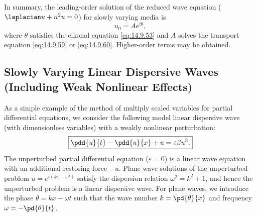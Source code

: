 In summary, the leading-order solution of the reduced wave equation ($\laplacian u + n^2 u = 0$) for slowly varying media is
\begin{equation}
u_0 = Ae^{i\theta},
\label{eq:14.9.61}
\end{equation}
where $\theta$ satisfies the eikonal equation \eqref{eq:14.9.53} and $A$ solves the transport equation \eqref{eq:14.9.59} or \eqref{eq:14.9.60}. Higher-order terms may be obtained.

\subsection{Slowly Varying Linear Dispersive Waves (Including Weak Nonlinear Effects)}
\label{subsec:14.9.5}

As a simple example of the method of multiply scaled variables for partial differential equations, we consider the following model linear dispersive wave (with dimensionless variables) with a weakly nonlinear perturbation:
\begin{equation}
\boxed{\pdd{u}{t} - \pdd{u}{x} + u = \varepsilon\beta u^3.}
\label{eq:14.9.62}
\end{equation}
The unperturbed partial differential equation ($\varepsilon = 0$) is a linear wave equation with an additional restoring force $-u$. Plane wave solutions of the unperturbed problem $u = e^{i(kx - \omega t)}$ satisfy the dispersion relation $\omega^2 = k^2 + 1$, and hence the unperturbed problem is a linear dispersive wave. For plane waves, we introduce the phase $\theta = kx - \omega t$ such that the wave number $k = \pd{\theta}{x}$ and frequency $\omega = -\pd{\theta}{t}$.

